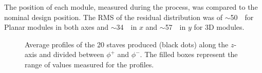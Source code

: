The position of each module, measured during the process, was compared to the nominal design position.
The RMS of the residual distribution was of $\sim$50~\microm\ for Planar  modules in both axes and $\sim$34~\microm\ in $x$ and $\sim$57~\microm\ in $y$ for 3D modules.


\begin{figure}
	\centering
	\caption{Average profiles of the 20 staves produced (black dots) along the $z$-axis and divided between $\phi^+$ and $\phi^-$. The filled boxes represent the range of values measured for the profiles.}
	\label{fig:staveprof}
\end{figure}

